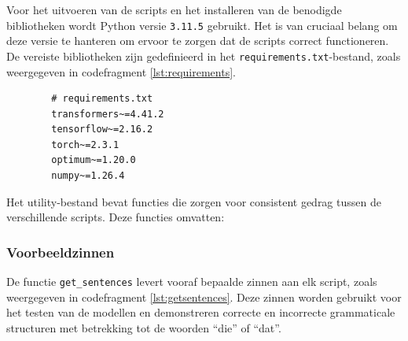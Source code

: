 Voor het uitvoeren van de scripts en het installeren van de benodigde bibliotheken wordt Python versie \texttt{3.11.5} gebruikt. Het is van cruciaal belang om deze versie te hanteren om ervoor te zorgen dat de scripts correct functioneren. De vereiste bibliotheken zijn gedefinieerd in het \texttt{requirements.txt}-bestand, zoals weergegeven in codefragment \ref{lst:requirements}. 

\begin{listing} [ht]
    \begin{verbatim}
        # requirements.txt
        transformers~=4.41.2
        tensorflow~=2.16.2
        torch~=2.3.1
        optimum~=1.20.0
        numpy~=1.26.4
    \end{verbatim}
    \caption[\texttt{requirements.txt}]{Het \texttt{requirements.txt}-bestand specificeert de versies van bibliotheken die nodig zijn om de scripts te draaien en zorgt voor de juiste compatibiliteit tussen de verschillende Python-pakketten.}
    \label{lst:requirements}
\end{listing}

Het utility-bestand bevat functies die zorgen voor consistent gedrag tussen de verschillende scripts. Deze functies omvatten:

\subsubsection{Voorbeeldzinnen}
De functie \texttt{get\_sentences} levert vooraf bepaalde zinnen aan elk script, zoals weergegeven in codefragment \ref{lst:getsentences}. Deze zinnen worden gebruikt voor het testen van de modellen en demonstreren correcte en incorrecte grammaticale structuren met betrekking tot de woorden ``die'' of ``dat''.


